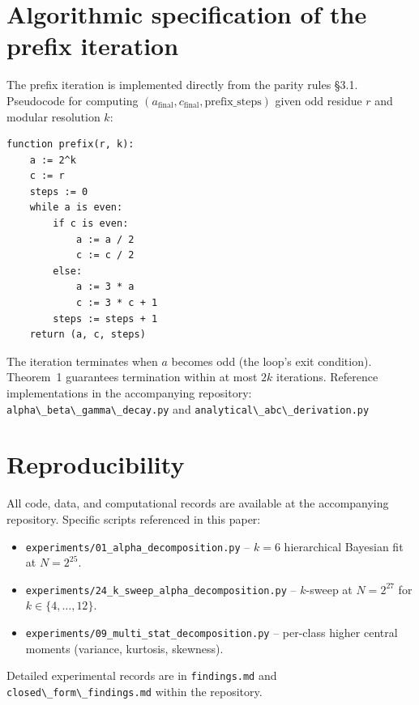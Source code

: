 \documentclass{article}
\theoremstyle{plain}
\begin{document}
\appendix

\begin{appendices}

\section{Algorithmic specification of the prefix iteration}
\label{app:prefix-algorithm}
The prefix iteration is implemented directly from the parity rules \S3.1. Pseudocode for computing $(a_{\text{final}}, c_{\text{final}}, \text{prefix\_steps})$ given odd residue $r$ and modular resolution $k$:

\begin{verbatim}
function prefix(r, k):
    a := 2^k
    c := r
    steps := 0
    while a is even:
        if c is even:
            a := a / 2
            c := c / 2
        else:
            a := 3 * a
            c := 3 * c + 1
        steps := steps + 1
    return (a, c, steps)
\end{verbatim}

The iteration terminates when $a$ becomes odd (the loop's exit condition). Theorem~1 guarantees termination within at most $2k$ iterations. Reference implementations in the accompanying repository: \verb|alpha\_beta\_gamma\_decay.py| and \verb|analytical\_abc\_derivation.py|

\section{Reproducibility}
\label{app:reproducibility}
All code, data, and computational records are available at the accompanying repository. Specific scripts referenced in this paper:

\begin{itemize}
    \item \verb|experiments/01_alpha_decomposition.py| -- $k=6$ hierarchical Bayesian fit at $N = 2^{25}$.
    \item \verb|experiments/24_k_sweep_alpha_decomposition.py| -- $k$-sweep at $N = 2^{27}$ for $k \in \{4, \ldots, 12\}$.
    \item \verb|experiments/09_multi_stat_decomposition.py| -- per-class higher central moments (variance, kurtosis, skewness).
\end{itemize}

Detailed experimental records are in \verb|findings.md| and \verb|closed\_form\_findings.md| within the repository.

\end{appendices}



\end{document}
